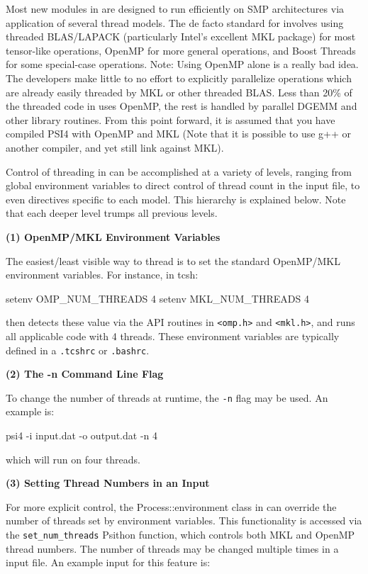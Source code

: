 Most new modules in \PSIfour are designed to run efficiently on SMP architectures
via application of several thread models. The de facto standard for \PSIfour
involves using threaded BLAS/LAPACK (particularly Intel's excellent MKL package)
for most tensor-like operations, OpenMP for more general operations, and Boost
Threads for some special-case operations. Note: Using OpenMP alone is a really
bad idea. The developers make little to no effort to explicitly parallelize
operations which are already easily threaded by MKL or other threaded BLAS. Less
than 20\% of the threaded code in \PSIfour uses OpenMP, the rest is handled by
parallel DGEMM and other library routines. From this point forward, it is
assumed that you have compiled PSI4 with OpenMP and MKL (Note that it is
possible to use g++ or another compiler, and yet still link against MKL).

Control of threading in \PSIfour can be accomplished at a variety of levels,
ranging from global environment variables to direct control of thread count in
the input file, to even directives specific to each model. This hierarchy is
explained below. Note that each deeper level trumps all previous levels.

\flushleft \textbf{(1) OpenMP/MKL Environment Variables}

The easiest/least visible way to thread \PSIfour is to set the standard OpenMP/MKL
environment variables. For instance, in tcsh:
\begin{Snippet}
setenv OMP_NUM_THREADS 4
setenv MKL_NUM_THREADS 4
\end{Snippet}
\PSIfour then detects these value via the API routines in \texttt{<omp.h>} and
\texttt{<mkl.h>}, and runs all applicable code with 4 threads. These environment
variables are typically defined in a \texttt{.tcshrc} or \texttt{.bashrc}.

\flushleft \textbf{(2) The -n Command Line Flag}

To change the number of threads at runtime, the \texttt{-n} flag may be used. An
example is:
\begin{Snippet}
psi4 -i input.dat -o output.dat -n 4
\end{Snippet}
which will run on four threads.

\flushleft \textbf{(3) Setting Thread Numbers in an Input}

For more explicit control, the Process::environment class in \PSIfour can
override the number of threads set by environment variables. This functionality
is accessed via the \texttt{set\_num\_threads} Psithon function, which controls
both MKL and OpenMP thread numbers. The number of threads may be changed
multiple times in a \PSIfour input file. An example input for this feature is:

